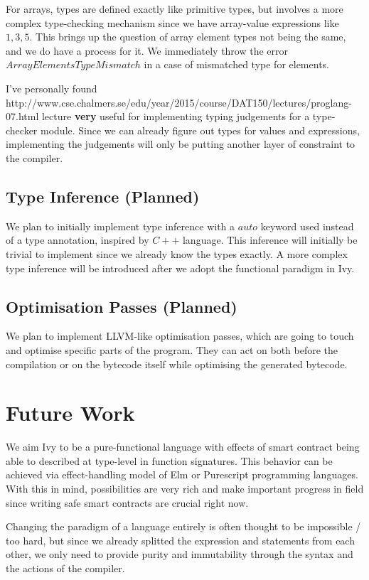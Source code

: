 \documentclass{article}
\begin{document}
For arrays, types are defined exactly like primitive types, but involves a more complex type-checking mechanism since we have array-value expressions like ${ 1, 3, 5}$. This brings up the question of array element types not being the same, and we do have a process for it. We immediately throw the error $ArrayElementsTypeMismatch$ in a case of mismatched type for elements.

I've personally found http://www.cse.chalmers.se/edu/year/2015/course/DAT150/lectures/proglang-07.html lecture \textbf{very} useful for implementing typing judgements for a type-checker module. Since we can already figure out types for values and expressions, implementing the judgements will only be putting another layer of constraint to the compiler.

\subsection{Type Inference (Planned)}
\label{subsec:type_inference}
We plan to initially implement type inference with a $auto$ keyword used instead of a type annotation, inspired by $C++$ language. This inference will initially be trivial to implement since we already know the types exactly. A more complex type inference will be introduced after we adopt the functional paradigm in Ivy.

\subsection{Optimisation Passes (Planned)}
\label{subsec:optimisation_passes}
We plan to implement LLVM-like optimisation passes, which are going to touch and optimise specific parts of the program. They can act on both before the compilation or on the bytecode itself while optimising the generated bytecode.
\section{Future Work}
We aim Ivy to be a pure-functional language with effects of smart contract being able to described at type-level in function signatures. This behavior can be achieved via effect-handling model of Elm or Purescript programming languages. With this in mind, possibilities are very rich and make important progress in field since writing safe smart contracts are crucial right now.

Changing the paradigm of a language entirely is often thought to be impossible / too hard, but since we already splitted the expression and statements from each other, we only need to provide purity and immutability through the syntax and the actions of the compiler.
\end{document}
